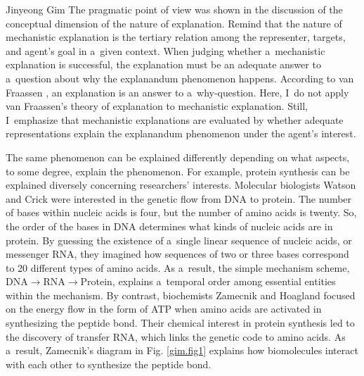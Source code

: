 \begin{artengenv}{Jinyeong Gim}
The pragmatic point of view was shown in the discussion of the conceptual dimension of the nature of explanation. Remind that the nature of mechanistic explanation is the tertiary relation among the representer, targets, and agent's goal in a~given context. When judging whether a~mechanistic explanation is successful, the explanation must be an adequate answer to a~question about why the explanandum phenomenon happens. According to van Fraassen
\parencite*[][]{van_fraassen_scientific_1980}, %
 an explanation is an answer to a~why-question. Here, I~do not apply van Fraassen's theory of explanation to mechanistic explanation. Still, I~emphasize that mechanistic explanations are evaluated by whether adequate representations explain the explanandum phenomenon under the agent's interest.

The same phenomenon can be explained differently depending on what aspects, to some degree, explain the phenomenon. For example, protein synthesis can be explained diversely concerning researchers' interests. Molecular biologists Watson and Crick were interested in the genetic flow from DNA to protein. The number of bases within nucleic acids is four, but the number of amino acids is twenty. So, the order of the bases in DNA determines what kinds of nucleic acids are in protein. By guessing the existence of a~single linear sequence of nucleic acids, or messenger RNA, they imagined how sequences of two or three bases correspond to 20 different types of amino acids. As a~result, the simple mechanism scheme, DNA$\to$RNA$\to$Protein, explains a~temporal order among essential entities within the mechanism. By contrast, biochemists Zamecnik and Hoagland focused on the energy flow in the form of ATP when amino acids are activated in synthesizing the peptide bond. Their chemical interest in protein synthesis led to the discovery of transfer RNA, which links the genetic code to amino acids. As a~result, Zamecnik's diagram in Fig. \ref{gim.fig1} explains how biomolecules interact with each other to synthesize the peptide bond.


\end{artengenv}
